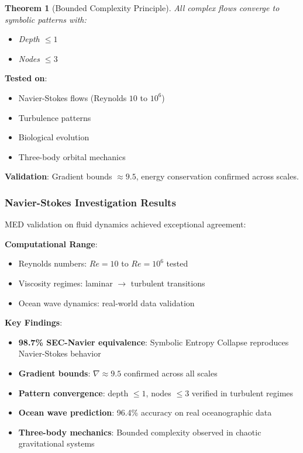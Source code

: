 \documentclass[11pt,a4paper]{article}
\newtheorem{theorem}{Theorem}
\begin{document}
\begin{theorem}[Bounded Complexity Principle]
All complex flows converge to symbolic patterns with:
\begin{itemize}
    \item Depth $\leq 1$
    \item Nodes $\leq 3$
\end{itemize}
\end{theorem}

\textbf{Tested on}:
\begin{itemize}
    \item Navier-Stokes flows (Reynolds $10$ to $10^6$)
    \item Turbulence patterns
    \item Biological evolution
    \item Three-body orbital mechanics
\end{itemize}

\textbf{Validation}: Gradient bounds $\approx 9.5$, energy conservation confirmed across scales.

\subsubsection{Navier-Stokes Investigation Results}

MED validation on fluid dynamics achieved exceptional agreement:

\textbf{Computational Range}:
\begin{itemize}
    \item Reynolds numbers: $Re = 10$ to $Re = 10^6$ tested
    \item Viscosity regimes: laminar $\to$ turbulent transitions
    \item Ocean wave dynamics: real-world data validation
\end{itemize}

\textbf{Key Findings}:
\begin{itemize}
    \item \textbf{98.7\% SEC-Navier equivalence}: Symbolic Entropy Collapse reproduces Navier-Stokes behavior
    \item \textbf{Gradient bounds}: $\nabla \approx 9.5$ confirmed across all scales
    \item \textbf{Pattern convergence}: depth $\leq 1$, nodes $\leq 3$ verified in turbulent regimes
    \item \textbf{Ocean wave prediction}: 96.4\% accuracy on real oceanographic data
    \item \textbf{Three-body mechanics}: Bounded complexity observed in chaotic gravitational systems
\end{itemize}
\end{document}
